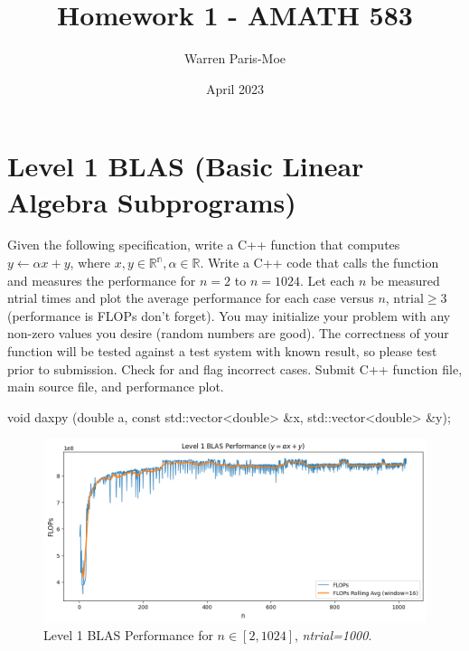 \documentclass[12pt]{article}
\title{Homework 1 - AMATH 583}
\author{Warren Paris-Moe}
\date{April 2023}
\begin{document}
\maketitle

\section{Level 1 BLAS (Basic Linear Algebra Subprograms)}
\begin{mdframed}
    Given the following specification, write a C++ function that computes $y \leftarrow \alpha x + y$, 
    where $x,y \in \mathbb{R^n}, \alpha \in \mathbb{R}$. Write a C++ code that calls the function
    and measures the performance for $n = 2$ to $n = 1024$. Let each $n$ be measured ntrial times and plot the
    average performance for each case versus $n$, $\text{ntrial} \geq 3$ (performance is FLOPs don’t forget).
    You may initialize your problem with any non-zero values you desire (random numbers are good). 
    The correctness of your function will be tested against a test system with known result, so please test 
    prior to submission. Check for and flag incorrect cases. Submit C++ function file, main source file, and 
    performance plot.
    \begin{verbnobox}[\small]
    void daxpy (double a, const std::vector<double> &x, std::vector<double> &y);
    \end{verbnobox}
\end{mdframed}

\begin{figure}[h!]
    \centering
    \includegraphics[scale=0.65]{img/q1-plot.png}
    \caption{Level 1 BLAS Performance for $n \in [2,1024]$, \textit{ntrial=1000}.}
    \label{fig:level1blas}
\end{figure}
\end{document}
